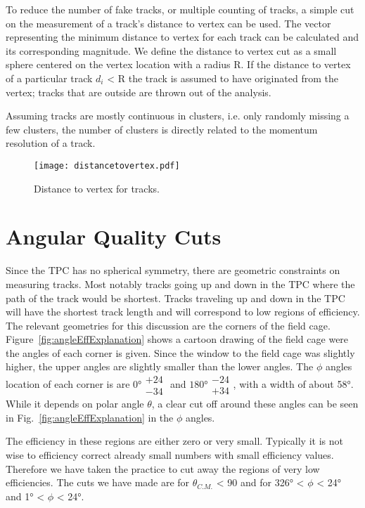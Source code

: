 To reduce the number of fake tracks, or multiple counting of tracks, a simple cut on the measurement of a track's distance to vertex can be used. The vector representing the minimum distance to vertex for each track can be calculated and its corresponding magnitude. We define the distance to vertex cut as a small sphere centered on the vertex location with a radius R. If the distance to vertex of a particular track $d_i$ < R the track is assumed to have originated from the vertex; tracks that are outside are thrown out of the analysis. 

Assuming tracks are mostly continuous in clusters, i.e. only randomly missing a few clusters, the number of clusters is directly related to the momentum resolution of a track. 


\begin{figure}[!htb]
\texttt{[image: distancetovertex.pdf]}
\label{fig:poca}
\caption{Distance to vertex for tracks.}
\end{figure}


\section{Angular Quality Cuts}
Since the TPC has no spherical symmetry, there are geometric constraints on measuring tracks. Most notably tracks going up and down in the TPC where the path of the track would be shortest. Tracks traveling up and down in the TPC will have the shortest track length and will correspond to low regions of efficiency. The relevant geometries for this discussion are the corners of the field cage. Figure~\ref{fig:angleEffExplanation} shows a cartoon drawing of the field cage were the angles of each corner is given. Since the window to the field cage was slightly higher, the upper angles are slightly smaller than the lower angles. The $\phi$ angles location of each corner is are $\ang{0}\substack{+24 \\ -34}$ and $\ang{180}\substack{-24 \\ +34}$, with a width of about \ang{58}. While it depends on polar angle $\theta$, a clear cut off around these angles can be seen in Fig.~\ref{fig:angleEffExplanation} in the $\phi$ angles. 

The efficiency in these regions are either zero or very small. Typically it is not wise to efficiency correct already small numbers with small efficiency values. Therefore we have taken the practice to cut away the regions of very low efficiencies. The cuts we have made are for $\theta_{C.M.}$ < 90 and for \ang{326} < $\phi$ < \ang{24} and \ang{1} < $\phi$ < \ang{24}.

